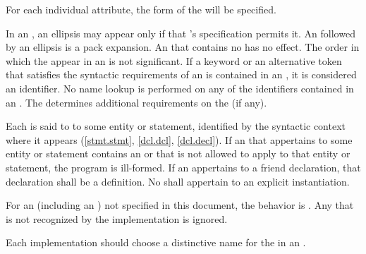 \pnum
\begin{note} For each individual attribute, the form of the
 will be specified. \end{note}

\pnum
In an , an ellipsis may appear only if that
's specification permits it. An  followed
by an ellipsis is a pack expansion.
An  that contains no  has no
effect. The order in which the  appear in an
 is not significant. If a
keyword
or an alternative token that satisfies the syntactic requirements
of an  is
contained in
an , it is considered an identifier. No name
lookup is performed on any of the identifiers contained in an
. The  determines additional
requirements on the  (if any).

\pnum
Each  is said to  to some entity or
statement, identified by the syntactic context where it appears
(\ref{stmt.stmt}, \ref{dcl.dcl},
\ref{dcl.decl}). If an  that appertains to some
entity or statement contains an  or  that
is not allowed to apply to that
entity or statement, the program is ill-formed. If an 
appertains to a friend declaration, that declaration shall be a
definition. No  shall appertain to an explicit
instantiation.

\pnum
For an 
(including an )
not specified in this document, the
behavior is .
Any  that is not recognized by the implementation
is ignored.
\begin{note}
Each implementation should choose a distinctive name for the
 in an .
\end{note}

